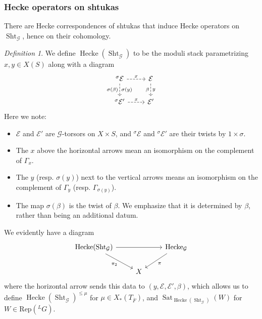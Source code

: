 \documentclass[reqno]{amsart}
\numberwithin{equation}{section}
\newcommand{\ol}[1]{\overline{#1}}
\newcommand{\Cal}[1]{\mathcal{#1}}
\newcommand{\mrm}[1]{\mathrm{#1}}
\DeclareMathOperator{\Sht}{Sht}
\DeclareMathOperator{\Hecke}{Hecke}
\DeclareMathOperator{\Sat}{Sat}
\theoremstyle{remark}
\newtheorem{defn}[thm]{Definition}
\numberwithin{equation}{section}
\begin{document}
\subsubsection{Hecke operators on shtukas}\label{sssec: hecke corr for shtuka}
 There are Hecke correspondences of shtukas that induce Hecke operators on $\Sht_{\Cal{G}}$, hence on their cohomology.  
 
 


\begin{defn}
We define $\Hecke(\Sht_{\Cal{G}})$ to be the moduli stack parametrizing $x,y \in X(S)$ along with a diagram
\[
\begin{tikzcd}
{}^{\sigma} \Cal{E}  \ar[r, dashed, "x"] \ar[d, dashed, "\sigma(y)", "\sigma(\beta)"']  & \Cal{E} \ar[d, dashed, "y", "\beta"'] \\
{}^{\sigma} \Cal{E}'  \ar[r, dashed, "x"] &   \Cal{E}' 
\end{tikzcd}
\]
Here we note: 
\begin{itemize}
\item $\Cal{E}$ and $\Cal{E}'$ are $\Cal{G}$-torsors on $X \times S$, and ${}^{\sigma} \Cal{E} $ and ${}^{\sigma} \Cal{E}'$ are their twists by $1 \times \sigma$. 
\item The $x$ above the horizontal arrows mean an isomorphism on the complement of $\Gamma_x$. 
\item The $y$ (resp. $\sigma(y)$) next to the vertical arrows means an isomorphism on the complement of $\Gamma_y$ (resp. $\Gamma_{\sigma(y)}$). 
\item The map $\sigma(\beta)$ is the twist of  $\beta$. We emphasize that it is determined by $\beta$, rather than being an additional datum.
\end{itemize}
\end{defn}

We evidently have a diagram
\[
\begin{tikzcd}
\Hecke(\Sht_{\Cal{G}}) \ar[rr] \ar[dr, "\pi_2"'] & &  \Hecke_{\Cal{G}} \ar[dl, "\pi"] \\
& X 
\end{tikzcd}
\]
where the horizontal arrow sends this data to $(y, \Cal{E}, \Cal{E}', \beta)$, which allows us to define $\Hecke(\Sht_{\Cal{G}})^{\leq\mu}$ for $\mu \in X_*(T_{\ol{F}})$, and $\Sat_{\Hecke(\Sht_{\Cal{G}})}(W)$ for  $W \in \mrm{Rep}({}^L G)$. 
\end{document}
